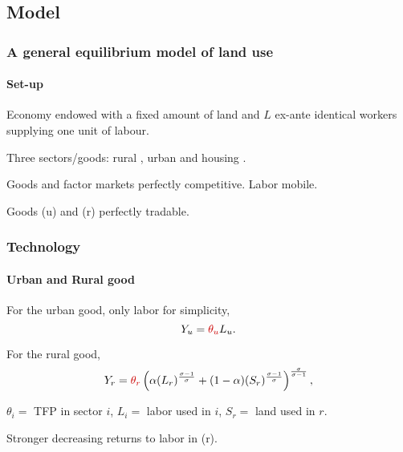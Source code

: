 \documentclass[aspectratio=169]{beamer}
\begin{document}
\subsection{Model}
\begin{frame}
\frametitle{A general equilibrium model of land use}
\framesubtitle{Set-up}

\begin{midi}
\item Economy endowed with a fixed amount of land and $L$ ex-ante identical workers supplying one unit of labour.
\item Three sectors/goods: rural  , urban  and housing .
\item Goods and factor markets perfectly competitive. Labor mobile.
\item Goods (u) and (r) perfectly tradable.
\end{midi}
\end{frame}


\begin{frame}
\frametitle{Technology}
\framesubtitle{Urban and Rural good}
\begin{midi}
\item For the urban good, only labor for simplicity,
\begin{equation*}
Y_u=\re{\theta_u}L_u.
\end{equation*}
\item For the rural good,
\begin{equation*}
Y_r=\re{\theta_r}\left(\alpha (L_r)^{\frac{\sigma-1}{\sigma}} +(1-\alpha)(S_r)^{\frac{\sigma-1}{\sigma}} \right)^{\frac{\sigma}{\sigma-1}},
\end{equation*}
\item $\theta_i=$ TFP in sector $i$, $L_i=$ labor used in $i$, $S_r=$ land used in $r$.
\item {}
\item Stronger decreasing returns to labor in (r).
\end{midi}

\end{frame}
\end{document}
